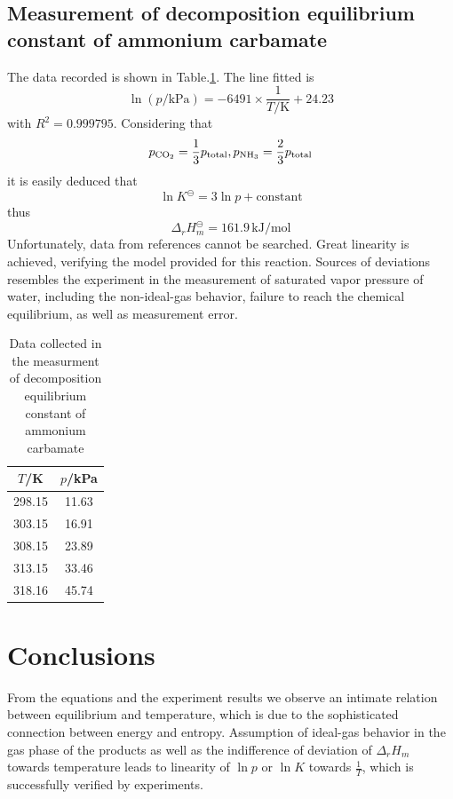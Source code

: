 \documentclass[%
 reprint,
 amsmath,amssymb,
 aps,
10.5pt,
]{revtex4-1}
\newcommand{\unit}[2]{#1 \, \mathrm{#2}}
\begin{document}
\subsection{Measurement of decomposition equilibrium constant of ammonium carbamate}
The data recorded is shown in Table.\ref{acdata}. The line fitted is 
\begin{equation}
\ln{(p/\mathrm{kPa})} = -6491 \times \frac{1}{T/\mathrm{K}} + 24.23
\end{equation}
with $R^2 = 0.999795$. Considering that
\begin{equation}
p_\text{\ce{CO2}} = \frac{1}{3} p_\text{total}, p_\text{\ce{NH3}} = \frac{2}{3} p_\text{total}
\end{equation}
it is easily deduced that
\begin{equation}
\ln{K^\ominus} = 3 \ln{p} + \mathrm{constant}
\end{equation}
thus
\begin{equation}
\Delta_r H_m^\ominus = \unit{161.9}{kJ/mol}
\end{equation}
Unfortunately, data from references cannot be searched. Great linearity is achieved, verifying the model provided for this reaction. Sources of deviations resembles the experiment in the measurement of saturated vapor pressure of water, including the non-ideal-gas behavior, failure to reach the chemical equilibrium, as well as measurement error.

\begin{table}
\centering
\caption{Data collected in the measurment of decomposition equilibrium constant of ammonium carbamate}
\begin{tabular}{cc}\hline
$T$/K & $p$/kPa \\\hline
 298.15 & 11.63 \\
 303.15 & 16.91 \\
 308.15 & 23.89 \\
 313.15 & 33.46 \\
 318.16 & 45.74 \\\hline
\end{tabular}
\label{acdata}
\end{table}

\section{Conclusions}
From the equations and the experiment results we observe an intimate relation between equilibrium and temperature, which is due to the sophisticated connection between energy and entropy. Assumption of ideal-gas behavior in the gas phase of the products as well as the indifference of deviation of $\Delta_r H_m$ towards temperature leads to linearity of $\ln{p}$ or $\ln{K}$ towards $\frac{1}{T}$, which is successfully verified by experiments. 


\end{document}
